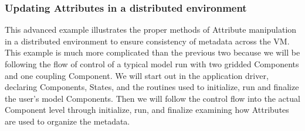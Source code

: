  
\setlength{\oldparskip}{\parskip}
\setlength{\parskip}{1.5ex}
\setlength{\oldparindent}{\parindent}
\setlength{\parindent}{0pt}
\setlength{\oldbaselineskip}{\baselineskip}
\setlength{\baselineskip}{11pt}
 
\def\bv{\begin{verbatim}}
\def\ev{\end{verbatim}}
\def\be{\begin{equation}}
\def\ee{\end{equation}}
\def\bea{\begin{eqnarray}}
\def\eea{\end{eqnarray}}
\def\bi{\begin{itemize}}
\def\ei{\end{itemize}}
\def\bn{\begin{enumerate}}
\def\en{\end{enumerate}}
\def\bd{\begin{description}}
\def\ed{\end{description}}
\def\({\left (}
\def\){\right )}
\def\[{\left [}
\def\]{\right ]}
\def\<{\left  \langle}
\def\>{\right \rangle}
\def\cI{{\cal I}}
\def\diag{\mathop{\rm diag}}
\def\tr{\mathop{\rm tr}}


 

   \subsubsection{Updating Attributes in a distributed environment}
  
   This advanced example illustrates the proper methods of Attribute manipulation
   in a distributed environment to ensure consistency of metadata across the VM.
   This example is much more complicated than the previous two because we will
   be following the flow of control of a typical model run with two gridded Components
   and one coupling Component.  We will start out in the application driver, declaring
   Components, States, and the routines used to initialize, run and finalize the user's
   model Components.  Then we will follow the control flow into the actual Component level
   through initialize, run, and finalize examining how Attributes are used to organize the
   metadata.
  
